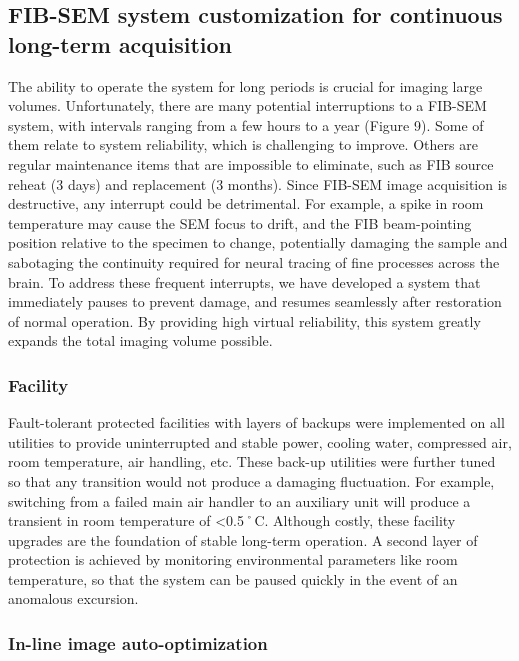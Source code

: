 \documentclass{article}
\begin{document}
\subsection*{FIB-SEM system customization for continuous long-term acquisition}

The ability to operate the system for long periods is crucial for imaging large volumes. Unfortunately, there are many potential interruptions to a FIB-SEM system, with intervals ranging from a few hours to a year (Figure 9). Some of them relate to system reliability, which is challenging to improve. Others are regular maintenance items that are impossible to eliminate, such as FIB source reheat (3 days) and replacement (3 months). Since FIB-SEM image acquisition is destructive, any interrupt could be detrimental. For example, a spike in room temperature may cause the SEM focus to drift, and the FIB beam-pointing position relative to the specimen to change, potentially damaging the sample and sabotaging the continuity required for neural tracing of fine processes across the brain. To address these frequent interrupts, we have developed a system that immediately pauses to prevent damage, and resumes seamlessly after restoration of normal operation. By providing high virtual reliability, this system greatly expands the total imaging volume possible.

\subsubsection*{Facility}

Fault-tolerant protected facilities with layers of backups were implemented on all utilities to provide uninterrupted and stable power, cooling water, compressed air, room temperature, air handling, etc. These back-up utilities were further tuned so that any transition would not produce a damaging fluctuation. For example, switching from a failed main air handler to an auxiliary unit will produce a transient in room temperature of <0.5˚C. Although costly, these facility upgrades are the foundation of stable long-term operation. A second layer of protection is achieved by monitoring environmental parameters like room temperature, so that the system can be paused quickly in the event of an anomalous excursion.

\subsubsection*{In-line image auto-optimization}
\end{document}
